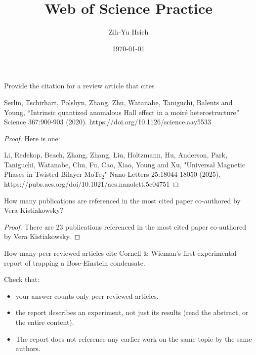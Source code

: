 \documentclass{article}
\title{Web of Science Practice}
\author{Zih-Yu Hsieh}
\date{\today}
\begin{document}
\maketitle

\begin{ques}\label{q1}
    Provide the citation for a review article that cites

    Serlin, Tschirhart, Polshyn, Zhang, Zhu, Watanabe, Taniguchi, Balents and Young, “Intrinsic quantized anomalous Hall effect in a moiré heterostructure” Science 367:900-903 (2020). https://doi.org/10.1126/science.aay5533

\end{ques}

\begin{proof}
    Here is one:

    \hfil

    Li, Redekop, Beach, Zhang, Zhang, Liu, Holtzmann, Hu, Anderson, Park, Taniguchi, Watanabe, Chu, Fu, Cao, Xiao, Young and Xu, "Universal Magnetic Phases in Twisted Bilayer MoTe$_2$" Nano Letters 25:18044-18050 (2025). https://pubs.acs.org/doi/10.1021/acs.nanolett.5c04751 
\end{proof}

\hfil

\begin{ques}
    How many publications are referenced in the most cited paper co-authored by Vera Kistiakowsky?
\end{ques}

\begin{proof}
    There are 23 publications referenced in the most cited paper co-authored by Vera Kistiakowsky.



\end{proof}

\hfil

\begin{ques}
    How many peer-reviewed articles cite Cornell \& Wieman’s first experimental report of trapping a Bose-Einstein condensate.

    Check that:
    \begin{itemize}
        \item  your answer counts only peer-reviewed articles.
        \item the report describes an experiment, not just its results (read the abstract, or the entire content).
        \item The report does not reference any earlier work on the same topic by the same authors.
    \end{itemize}
\end{ques}
\end{document}
